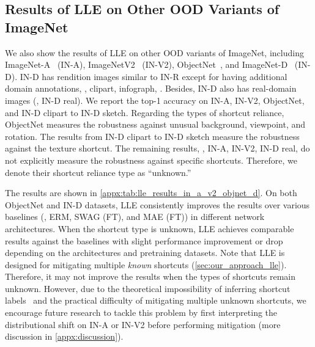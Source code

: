 \documentclass[10pt,twocolumn,letterpaper]{article}
\begin{document}
\subsection{Results of LLE on Other OOD Variants of ImageNet}
\label{appx:subsec:lle_other_ood_imagenet}

We also show the results of LLE on other OOD variants of ImageNet, including ImageNet-A~\cite{hendrycks2021IEEECVFConf.Comput.Vis.PatternRecognit.CVPRNatural} (IN-A), ImageNetV2~\cite{recht2019Proc.36thInt.Conf.Mach.Learn.ImageNet} (IN-V2), ObjectNet~\cite{barbu2019Adv.NeuralInf.Process.Syst.ObjectNet}, and ImageNet-D~\cite{rusak2022ImageNetD,rusak2021Adapting} (IN-D).
IN-D has rendition images similar to IN-R except for having additional domain annotations, \eg, clipart, infograph, \etc. Besides, IN-D also has real-domain images (\ie, IN-D real).
We report the top-1 accuracy on IN-A, IN-V2, ObjectNet, and IN-D clipart to IN-D sketch.
Regarding the types of shortcut reliance, ObjectNet measures the robustness against unusual background, viewpoint, and rotation.
The results from IN-D clipart to IN-D sketch measure the robustness against the texture shortcut.
The remaining results, \ie, IN-A, IN-V2, IN-D real, do not explicitly measure the robustness against specific shortcuts. Therefore, we denote their shortcut reliance type as ``unknown.''

The results are shown in \cref{appx:tab:lle_results_in_a_v2_objnet_d}. On both ObjectNet and IN-D datasets, LLE consistently improves the results over various baselines (\ie, ERM, SWAG (FT), and MAE (FT)) in different network architectures. When the shortcut type is unknown, LLE achieves comparable results against the baselines with slight performance improvement or drop depending on the architectures and pretraining datasets. Note that LLE is designed for mitigating multiple \textit{known} shortcuts (\cf \cref{sec:our_approach_lle}). Therefore, it may not improve the results when the types of shortcuts remain unknown. However, due to the theoretical impossibility of inferring shortcut labels~\cite{lin2022Adv.NeuralInf.Process.Syst.ZINa} and the practical difficulty of mitigating multiple unknown shortcuts, we encourage future research to tackle this problem by first interpreting the distributional shift on IN-A or IN-V2 before performing mitigation (more discussion in \cref{appx:discussion}).
\end{document}
